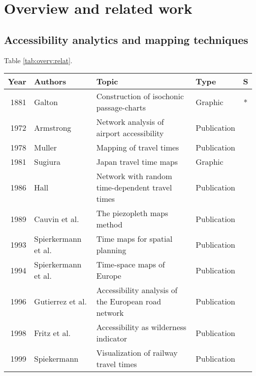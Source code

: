 
\cleardoublepage
\chapter{Overview and related work}
  \label{chap:overv}

  \section{Accessibility analytics and mapping techniques}
    \label{sec:overv:accss}

    Table \ref{tab:overv:relat}.

    \begin{table}[htb]
      \tiny \centering
      \begin{tabular}{r|l|l|l|c}
       \textbf{Year} & \textbf{Authors} & \textbf{Topic} & \textbf{Type} & \textbf{S} \\
       \hline
        1881 & Galton \cite{galton1881construction} & Construction of isochonic passage-charts  & Graphic  & * \\
        1972 & Armstrong \cite{armstrong1972network} & Network analysis of airport accessibility  & Publication  & \\
        1978 & Muller \cite{muller1978mapping} & Mapping of travel times  & Publication  & \\
        1981 & Sugiura \cite{Sugiura1981} & Japan travel time maps  & Graphic  & \\
        1986 & Hall \cite{hall1986fastest} & Network with random time-dependent travel times  &  Publication & \\
        1989 & Cauvin et al. \cite{cauvin1989cartographic} & The piezopleth maps method  & Publication  & \\
        1993 & Spierkermann et al. \cite{spiekermann1993zeitkarten} & Time maps for spatial planning  & Publication  & \\
        1994 & Spierkermann et al. \cite{spiekermann1994new} & Time-space maps of Europe  & Publication  & \\
        1996 & Gutierrez et al. \cite{gutierrez1996accessibility} & Accessibility analysis of the European road network  & Publication  & \\
        1998 & Fritz et al. \cite{fritz1998accessibility} &  Accessibility as wilderness indicator  & Publication  & \\
        1999 & Spiekermann \cite{spiekermann1999visualisierung} & Visualization of railway travel times & Publication & \\

\end{tabular}
\end{table}
